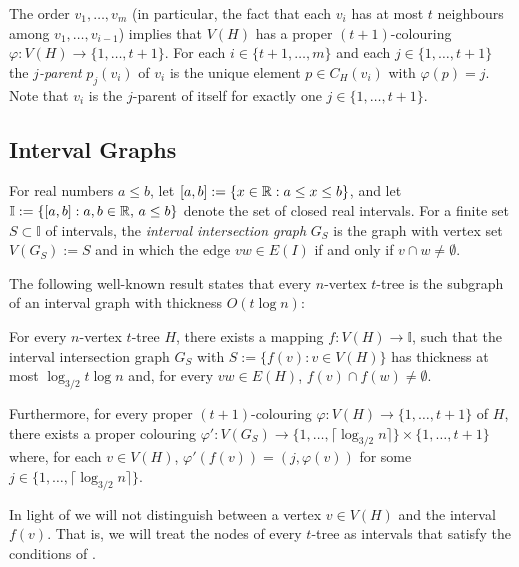 \documentclass[kpfonts]{patmorin}
\begin{document}
The order $v_1,\ldots,v_m$ (in particular, the fact that each $v_i$ has at most $t$ neighbours among $v_1,\ldots,v_{i-1}$) implies that $V(H)$ has a proper $(t+1)$-colouring $\varphi:V(H)\to\{1,\ldots,t+1\}$.  For each $i\in\{t+1,\ldots,m\}$ and each $j\in\{1,\ldots,t+1\}$ the \emph{$j$-parent} $p_j(v_i)$ of $v_i$ is the unique element $p\in C_H(v_i)$ with $\varphi(p)=j$.  Note that $v_i$ is the $j$-parent of itself for exactly one $j\in\{1,\ldots,t+1\}$.

\subsection{Interval Graphs}

For real numbers $a\le b$, let $[a,b]:=\{ x\in\mathbb{R}: a\le x\le b\}$, and let
$\mathbb{I}:=\{[a,b]: a,b\in\mathbb{R},\, a\le b\}$ denote the set of closed real intervals.  For a finite set $S\subset\mathbb{I}$ of intervals, the \emph{interval intersection graph} $G_S$ is the graph with vertex set $V(G_S):=S$ and in which the edge $vw\in E(I)$ if and only if $v\cap w\neq \emptyset$.  


The following well-known result states that every $n$-vertex $t$-tree is the subgraph of an interval graph with thickness $O(t\log n)$:

\begin{lem}
  For every $n$-vertex $t$-tree $H$, there exists a mapping $f:V(H)\to\mathbb{I}$, such that the interval intersection graph $G_S$ with $S:=\{f(v):v\in V(H)\}$ has thickness at most $\log_{3/2} t\log n$ and, for every $vw\in E(H)$, $f(v)\cap f(w)\neq\emptyset$.  
  
  Furthermore, for every proper $(t+1)$-colouring $\varphi:V(H)\to\{1,\ldots,t+1\}$ of $H$, there exists a proper colouring $\varphi':V(G_S)\to\{1,\ldots,\lceil\log_{3/2} n\rceil\}\times\{1,\ldots,t+1\}$ where, for each $v\in V(H)$, $\varphi'(f(v))=(j,\varphi(v))$ for some $j\in\{1,\ldots,\lceil\log_{3/2} n\rceil\}$.
\end{lem}

In light of  we will not distinguish between a vertex $v\in V(H)$ and the interval $f(v)$.  That is, we will treat the nodes of every $t$-tree as intervals that satisfy the conditions of .
\end{document}

